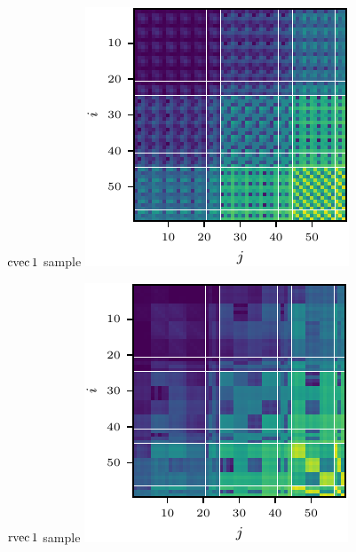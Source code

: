 \switchcolumn[1]
\begin{figure}
  \centering
  \begin{minipage}[t]{0.495\linewidth}
    \centering
    $\operatorname{cvec} 1$ sample\vspace{1ex}
    \includegraphics[width=0.8\linewidth]{../kfs/plots/synthetic_cvec_mcfisher_1.pdf}
  \end{minipage}
  \hfill
  \begin{minipage}[t]{0.495\linewidth}
    \centering
    $\operatorname{rvec} 1$ sample\vspace{1ex}
    \includegraphics[width=0.8\linewidth]{../kfs/plots/synthetic_rvec_mcfisher_1.pdf}

\end{minipage}
\end{figure}
